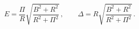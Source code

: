 \begin{equation}
E=\frac{\Pi}{R} \sqrt{\frac{B^2+R^2}{R^2+\Pi ^2}}\,,\qquad \Delta=R
\sqrt{\frac{B^2+R^2}{ R^2+\Pi ^2}}\,.
 \label{E2}
\end{equation}

